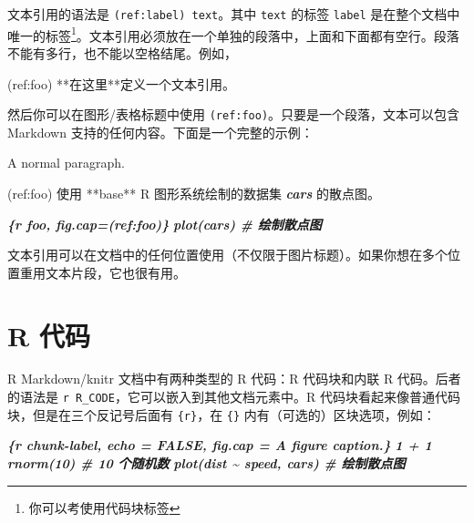 \documentclass[
  12pt,
]{krantz}
\newenvironment{Shaded}{\begin{snugshade}}{\end{snugshade}}
\newcommand{\InformationTok}[1]{\textcolor[rgb]{0.56,0.35,0.01}{\textbf{\textit{#1}}}}
\newcommand{\NormalTok}[1]{#1}
\theoremstyle{definition}
\theoremstyle{definition}
\theoremstyle{definition}
\theoremstyle{definition}
\theoremstyle{remark}
\begin{document}
文本引用的语法是 \texttt{(ref:label)\ text}。其中 \texttt{text} 的标签 \texttt{label} 是在整个文档中唯一的标签\footnote{你可以考使用代码块标签}。文本引用必须放在一个单独的段落中，上面和下面都有空行。段落不能有多行，也不能以空格结尾。例如，

\begin{Shaded}
\begin{Highlighting}[]
\NormalTok{(ref:foo) **在这里**定义一个文本引用。}
\end{Highlighting}
\end{Shaded}

然后你可以在图形/表格标题中使用 \texttt{(ref:foo)}。只要是一个段落，文本可以包含 Markdown 支持的任何内容。下面是一个完整的示例：

\begin{Shaded}
\begin{Highlighting}[]
\NormalTok{A normal paragraph.}

\NormalTok{(ref:foo) 使用 **base** R 图形系统绘制的数据集 }\InformationTok{\textasciigrave{}cars\textasciigrave{}}\NormalTok{ 的散点图。}

\InformationTok{\textasciigrave{}\textasciigrave{}\textasciigrave{}\{r foo, fig.cap=\textquotesingle{}(ref:foo)\textquotesingle{}\}}
\InformationTok{plot(cars)  \# 绘制散点图}
\InformationTok{\textasciigrave{}\textasciigrave{}\textasciigrave{}}
\end{Highlighting}
\end{Shaded}

文本引用可以在文档中的任何位置使用（不仅限于图片标题）。如果你想在多个位置重用文本片段，它也很有用。

\hypertarget{r-code}{%
\section{R 代码}\label{r-code}}

R Markdown/knitr 文档中有两种类型的 R 代码：R 代码块和内联 R 代码。后者的语法是 \texttt{\textasciigrave{}r\ R\_CODE\textasciigrave{}}，它可以嵌入到其他文档元素中。R 代码块看起来像普通代码块，但是在三个反记号后面有 \texttt{\{r\}}，在 \texttt{\{\}} 内有（可选的）区块选项，例如：

\begin{Shaded}
\begin{Highlighting}[]
\InformationTok{\textasciigrave{}\textasciigrave{}\textasciigrave{}\{r chunk{-}label, echo = FALSE, fig.cap = \textquotesingle{}A figure caption.\textquotesingle{}\}}
\InformationTok{1 + 1}
\InformationTok{rnorm(10)  \# 10 个随机数}
\InformationTok{plot(dist \textasciitilde{} speed, cars)  \# 绘制散点图}
\InformationTok{\textasciigrave{}\textasciigrave{}\textasciigrave{}}
\end{Highlighting}
\end{Shaded}
\end{document}
